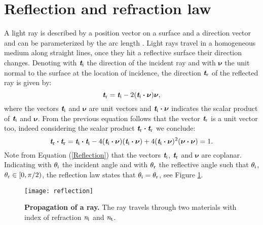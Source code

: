 \section{Reflection and refraction law}\label{sec:reflection}
A light ray is described by a position vector  on a surface and a direction vector  and can be parameterized by the arc length .
Light rays travel in a homogeneous medium along straight lines, once they hit a reflective surface their direction changes.
 Denoting with $\textit{\textbf{t}}_\textrm{i}$ the direction of the incident ray and with $\boldsymbol{\nu}$ the unit normal to the surface at the location of incidence, the direction $\textit{\textbf{t}}_\textrm{r}$ of the reflected ray is given by:
 \begin{equation}\label{Reflection}
  \textit{\textbf{t}}_\textrm{r} = \textit{\textbf{t}}_\textrm{i}-2 (\textit{\textbf{t}}_\textrm{i}\boldsymbol{\cdot}\boldsymbol{\nu})\boldsymbol{\nu},
\end{equation}
where the vectors $\textit{\textbf{t}}_\textrm{i}$ and $\boldsymbol{\nu}$ are unit vectors and $\textit{\textbf{t}}_\textrm{i}\boldsymbol{\cdot}\boldsymbol{\nu}$ indicates the scalar product of
$\textit{\textbf{t}}_\textrm{i}$ and $\boldsymbol{\nu}$. 
From the previous equation follows that the vector  $\textit{\textbf{t}}_\textrm{r}$ is a unit vector too, indeed considering the scalar product $\textit{\textbf{t}}_\textrm{r}\boldsymbol{\cdot}\textit{\textbf{t}}_\textrm{r}$ we conclude:
\begin{equation}\label{unit_vector}
\textit{\textbf{t}}_\textrm{r}\boldsymbol{\cdot}\textit{\textbf{t}}_\textrm{r} = \textit{\textbf{t}}_\textrm{i}\boldsymbol{\cdot}\textit{\textbf{t}}_\textrm{i} 
- 4(\textit{\textbf{t}}_\textrm{i}\boldsymbol{\cdot}\boldsymbol{\nu})(\textit{\textbf{t}}_\textrm{i}\boldsymbol{\cdot}\boldsymbol{\nu})+
4(\textit{\textbf{t}}_\textrm{i}\boldsymbol{\cdot}\boldsymbol{\nu})^2(\boldsymbol{\nu}\boldsymbol{\cdot}\boldsymbol{\nu})=1 .
\end{equation} 
Note from Equation (\ref{Reflection}) that the vectors $\textit{\textbf{t}}_\textrm{i}$, $\textit{\textbf{t}}_\textrm{r}$ and $\boldsymbol{\nu}$ are coplanar.
Indicating with $\theta_\textrm{i}$ the incident angle and with $\theta_\textrm{r}$ the reflective angle such that $\theta_\textrm{i}$, $\theta_\textrm{r} \in[0, \pi/2)$,
the reflection law states that $\theta_\textrm{i}=\theta_\textrm{r}$, see Figure \ref{fig:Snell}.
\begin{figure}[t]
 \label{fig:Snell}
     \begin{center}
     \texttt{[image: reflection]}
     \end{center}
     \caption{\textbf{Propagation of a ray.} The ray travels through two materials with index of refraction $\textit{n}_\textrm{i}$ and $\textit{n}_\textrm{t}$.}%
\label{fig:Snell}
 \end{figure}
